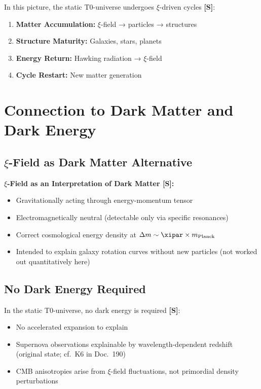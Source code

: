 	In this picture, the static T0-universe undergoes $\xi$-driven cycles \textbf{[S]}:
	
	\begin{enumerate}
		\item \textbf{Matter Accumulation:} $\xi$-field → particles → structures
		\item \textbf{Structure Maturity:} Galaxies, stars, planets
		\item \textbf{Energy Return:} Hawking radiation → $\xi$-field
		\item \textbf{Cycle Restart:} New matter generation
	\end{enumerate}
	
	\section{Connection to Dark Matter and Dark Energy}
	
	\subsection{$\xi$-Field as Dark Matter Alternative}
	
	\begin{keyresult}
		\textbf{$\xi$-Field as an Interpretation of Dark Matter [S]:}
		
		\begin{itemize}
			\item Gravitationally acting through energy-momentum tensor
			\item Electromagnetically neutral (detectable only via specific resonances)
			\item Correct cosmological energy density at $\Delta m \sim \xipar \times m_{\text{Planck}}$
			\item Intended to explain galaxy rotation curves without new particles (not worked out quantitatively here)
		\end{itemize}
	\end{keyresult}
	
	\subsection{No Dark Energy Required}
	
	In the static T0-universe, no dark energy is required \textbf{[S]}:
	
	\begin{itemize}
		\item No accelerated expansion to explain
		\item Supernova observations explainable by wavelength-dependent redshift (original state; cf.\ K6 in Doc.~190)
		\item CMB anisotropies arise from $\xi$-field fluctuations, not primordial density perturbations
	\end{itemize}
	
